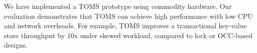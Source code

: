 



We have implemented a TOMS prototype using commodity hardware. Our evaluation demonstrates that TOMS can achieve high performance with low CPU and network overheads. For example, TOMS improves a transactional key-value store throughput by 10x under skewed workload, compared to lock or OCC-based designs.
